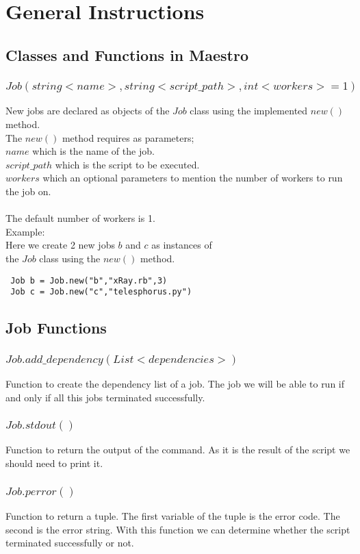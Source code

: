 \section{General Instructions}
\label{sect:general}

\subsection*{Classes and Functions in Maestro}

\subsubsection*{$Job(string <name>, string <script\_path>, int <workers>=1)$}
New jobs are declared as objects of the $Job$ class using the implemented $new()$ method.\\
The $new()$ method requires as parameters;\\
$name$ which is the name of the job.\\
$script\_path$ which is the script to be executed.\\
$workers$ which an optional parameters to mention the number of workers to run the job on.\\\\
The default number of workers is 1.\\
Example:\\
Here we create 2 new jobs $b$ and $c$ as instances of \\the $Job$ class using the $new()$ method.
\begin{verbatim}
 Job b = Job.new("b","xRay.rb",3)
 Job c = Job.new("c","telesphorus.py")
\end{verbatim}
\subsection*{Job Functions}
\subsubsection*{$Job.add\_dependency(List <dependencies>)$}
Function to create the dependency list of a job. The job we will be
able to run if and only if all this jobs terminated successfully.
\subsubsection*{$Job.stdout()$}
Function to return the output of the command. As it is the result of the script we should need to print it.
\subsubsection*{$Job.perror()$}
Function to return a tuple. The first variable of the tuple is the error code. The second is the error string.
With this function we can determine whether the script terminated successfully or not.
